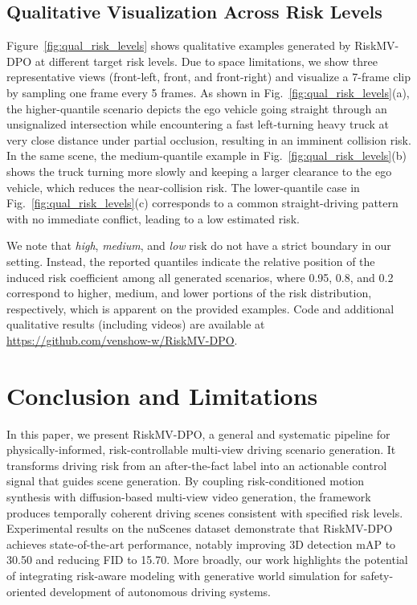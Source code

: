 \documentclass{article}
\begin{document}
\subsection{Qualitative Visualization Across Risk Levels}
\label{subsec:qual_risk_levels}
Figure~\ref{fig:qual_risk_levels} shows qualitative examples generated by RiskMV-DPO at different target risk levels. 
Due to space limitations, we show three representative views (front-left, front, and front-right) and visualize a 7-frame clip by sampling one frame every 5 frames. 
As shown in Fig.~\ref{fig:qual_risk_levels}(a), the higher-quantile scenario depicts the ego vehicle going straight through an unsignalized intersection while encountering a fast left-turning heavy truck at very close distance under partial occlusion, resulting in an imminent collision risk.
In the same scene, the medium-quantile example in Fig.~\ref{fig:qual_risk_levels}(b) shows the truck turning more slowly and keeping a larger clearance to the ego vehicle, which reduces the near-collision risk.
The lower-quantile case in Fig.~\ref{fig:qual_risk_levels}(c) corresponds to a common straight-driving pattern with no immediate conflict, leading to a low estimated risk.

We note that \emph{high}, \emph{medium}, and \emph{low} risk do not have a strict boundary in our setting.
Instead, the reported quantiles indicate the relative position of the induced risk coefficient among all generated scenarios, where 0.95, 0.8, and 0.2 correspond to higher, medium, and lower portions of the risk distribution, respectively, which is apparent on the provided examples. Code and additional qualitative results (including videos) are available at \url{https://github.com/venshow-w/RiskMV-DPO}.

\section{Conclusion and Limitations}

In this paper, we present RiskMV-DPO, a general and systematic pipeline for physically-informed, risk-controllable multi-view driving scenario generation. It transforms driving risk from an after-the-fact label into an actionable control signal that guides scene generation. By coupling risk-conditioned motion synthesis with diffusion-based multi-view video generation, the framework produces temporally coherent driving scenes consistent with specified risk levels. Experimental results on the nuScenes dataset demonstrate that RiskMV-DPO achieves state-of-the-art performance, notably improving 3D detection mAP to 30.50 and reducing FID to 15.70. More broadly, our work highlights the potential of integrating risk-aware modeling with generative world simulation for safety-oriented development of autonomous driving systems.
\end{document}
